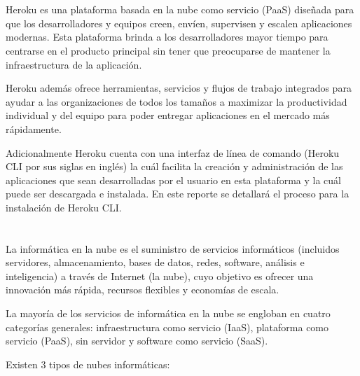\documentclass[10pt,a4paper]{article} %
\begin{document}
	\section{}%
	{\large Heroku es una plataforma basada en la nube como servicio (PaaS) dise{\~n}ada para que los desarrolladores y equipos creen, env{\'i}en, supervisen y escalen aplicaciones modernas. Esta plataforma brinda a los desarrolladores mayor tiempo para centrarse en el producto principal sin tener que preocuparse de mantener la infraestructura de la aplicaci{\'o}n. 
		
		
		\vspace{0.5cm}
		Heroku adem{\'a}s ofrece herramientas, servicios y flujos de trabajo integrados para ayudar a las organizaciones de todos los tama{\~n}os a maximizar la productividad individual y del equipo para poder entregar aplicaciones en el mercado m{\'a}s r{\'a}pidamente.
		
		\vspace{0.5cm}
		Adicionalmente Heroku cuenta con una interfaz de l{\'i}nea de comando (Heroku CLI por sus siglas en ingl{\'e}s) la cu{\'a}l facilita la creaci{\'o}n y administraci{\'o}n de las aplicaciones que sean desarrolladas por el usuario en esta plataforma y la cu{\'a}l puede ser descargada e instalada. En este reporte se detallar{\'a} el proceso para la instalaci{\'o}n de Heroku CLI.}
	
	
	\pagebreak
	
	\section{\color{colorIPN}{Conceptos}}
	
	\subsection{ }
	{\large La inform{\'a}tica en la nube es el suministro de servicios inform{\'a}ticos (incluidos servidores, almacenamiento, bases de datos, redes, software, an{\'a}lisis e inteligencia) a trav{\'e}s de Internet (la nube), cuyo objetivo es ofrecer una innovaci{\'o}n m{\'a}s r{\'a}pida, recursos flexibles y econom{\'i}as de escala.
		
		
		\vspace{0.5cm}
		La mayor{\'i}a de los servicios de inform{\'a}tica en la nube se engloban en cuatro categor{\'i}as generales: infraestructura como servicio (IaaS), plataforma como servicio (PaaS), sin servidor y software como servicio (SaaS).
		
		
		\vspace{0.5cm}
		Existen 3 tipos de nubes inform{\'a}ticas:}
	
\end{document}
